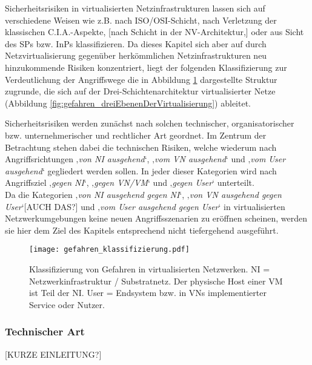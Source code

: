 Sicherheitsrisiken in virtualisierten Netzinfrastrukturen lassen sich auf verschiedene Weisen wie z.B. nach ISO/OSI-Schicht, nach Verletzung der klassischen C.I.A.-Aspekte, [nach Schicht in der NV-Architektur,] oder aus Sicht des SPs bzw. InPs klassifizieren. Da dieses Kapitel sich aber auf durch Netzvirtualisierung gegenüber herkömmlichen Netzinfrastrukturen neu hinzukommende Risiken konzentriert, liegt der folgenden Klassifizierung zur Verdeutlichung der Angriffswege die in Abbildung \ref{fig:gefahren_klassifizierung} dargestellte Struktur zugrunde, die sich auf der Drei-Schichtenarchitektur virtualisierter Netze (Abbildung \ref{fig:gefahren_dreiEbenenDerVirtualisierung}) ableitet.

Sicherheitsrisiken werden zunächst nach solchen technischer, organisatorischer bzw. unternehmerischer und rechtlicher Art geordnet. Im Zentrum der Betrachtung stehen dabei die technischen Risiken, welche wiederum nach Angriffsrichtungen ‚\textit{von NI ausgehend}‘, ‚\textit{vom VN ausgehend}‘ und ‚\textit{vom User ausgehend}‘ gegliedert werden sollen. In jeder dieser Kategorien wird nach Angriffsziel ‚\textit{gegen NI}‘, ‚\textit{gegen VN/VM}‘ und ‚\textit{gegen User}‘ unterteilt. \\
Da die Kategorien ‚\textit{von NI ausgehend gegen NI}‘, ‚\textit{von VN ausgehend gegen User}‘[AUCH DAS?] und ‚\textit{vom User ausgehend gegen User}‘ in virtualisierten Netzwerkumgebungen keine neuen Angriffsszenarien zu eröffnen scheinen, werden sie hier dem Ziel des Kapitels entsprechend nicht tiefergehend ausgeführt. 


\begin{figure}[htb]
	\begin{center}
	\texttt{[image: gefahren\_klassifizierung.pdf]}
	\caption{\label{fig:gefahren_klassifizierung} Klassifizierung von Gefahren in virtualisierten Netzwerken. 
		\newline NI = Netzwerkinfrastruktur / Substratnetz. Der physische Host einer VM ist Teil der NI.
		\newline User = Endsystem bzw. in VNs implementierter Service oder Nutzer.}
	\end{center}
\end{figure}





\subsubsection{Technischer Art}
\label{subsubsec:gefahren_virt_technisch}
[KURZE EINLEITUNG?]


